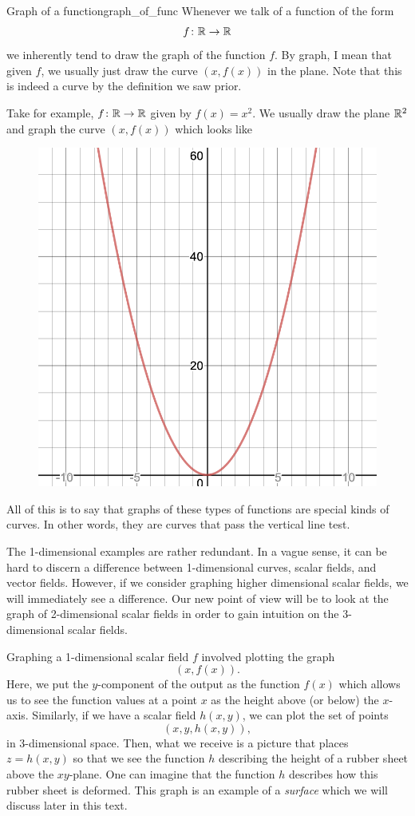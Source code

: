                 \begin{ex}{Graph of a function}{graph_of_func}
                Whenever we talk of a function of the form
                \[
                f\colon \mathbb{R} \to \mathbb{R}
                \]
                we inherently tend to draw the graph of the function $f$.  By graph, I mean that given $f$, we usually just draw the curve $(x,f(x))$ in the plane. Note that this is indeed a curve by the definition we saw prior.
                
                Take for example, $f\colon \mathbb{R} \to \mathbb{R}$ given by $f(x)=x^2$.  We usually draw the plane $\mathbb{R}^2$ and graph the curve $(x,f(x))$ which looks like
                \begin{figure}[H]
                    \centering
                    \includegraphics[width=.5\textwidth]{Figures_Part_6/quadratic_curve.png}           
                \end{figure}
                All of this is to say that graphs of these types of functions are special kinds of curves.  In other words, they are curves that pass the vertical line test. 
                \end{ex}
                
                The 1-dimensional examples are rather redundant.  In a vague sense, it can be hard to discern a difference between 1-dimensional curves, scalar fields, and vector fields.  However, if we consider graphing higher dimensional scalar fields, we will immediately see a difference.  Our new point of view will be to look at the graph of 2-dimensional scalar fields in order to gain intuition on the 3-dimensional scalar fields.  
                
                Graphing a 1-dimensional scalar field $f$ involved plotting the graph
                \[
                (x,f(x)).
                \]
                Here, we put the $y$-component of the output as the function $f(x)$ which allows us to see the function values at a point $x$ as the height above (or below) the $x$-axis. Similarly, if we have a scalar field $h(x,y)$, we can plot the set of points
                \[
                (x,y,h(x,y)),
                \]
                in 3-dimensional space.  Then, what we receive is a picture that places $z=h(x,y)$ so that we see the function $h$ describing the height of a rubber sheet above the $xy$-plane. One can imagine that the function $h$ describes how this rubber sheet is deformed. This graph is an example of a \emph{surface} which we will discuss later in this text.
                
